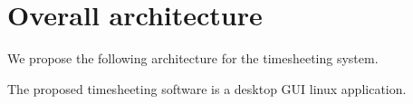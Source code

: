 \section{Overall architecture}
We propose the following architecture for the timesheeting system.

The proposed timesheeting software is a desktop GUI linux application.

